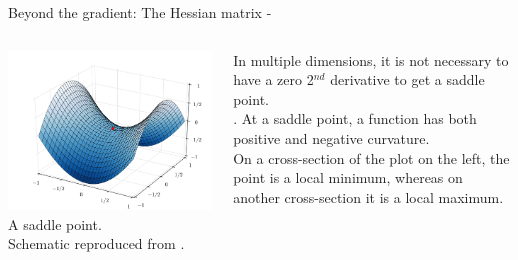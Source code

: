 \begin{frame}[t,allowframebreaks]{
    Beyond the gradient: The Hessian matrix -}
    \begin{columns}
        \begin{column}{0.70\textwidth}        
            \begin{center}
                \includegraphics[width=1.00\textwidth]
                    {./images/grad_descent/wikipedia_saddle_point.png}\\
                {\tiny 
                    \vspace{0.2cm}
                    A saddle point.\\
                    \color{col:attribution} 
                    Schematic reproduced from \cite{Wikipedia:SaddlePoint}.\\
                }
            \end{center}        
        \end{column}
        \begin{column}{0.30\textwidth}
            {\small
            In multiple dimensions, it is not necessary to have a zero
            2$^{nd}$ derivative to get a \gls{saddle point}.\\
            \vspace{0.3cm}.
            At a \gls{saddle point},
            a function has both positive and negative curvature.\\
            \vspace{0.3cm}
            On a cross-section of the plot on the left,
            the point is a \gls{local minimum},
            whereas on another cross-section it is
            a \gls{local maximum}.\\
            }
        \end{column}
    \end{columns}

\end{frame}



